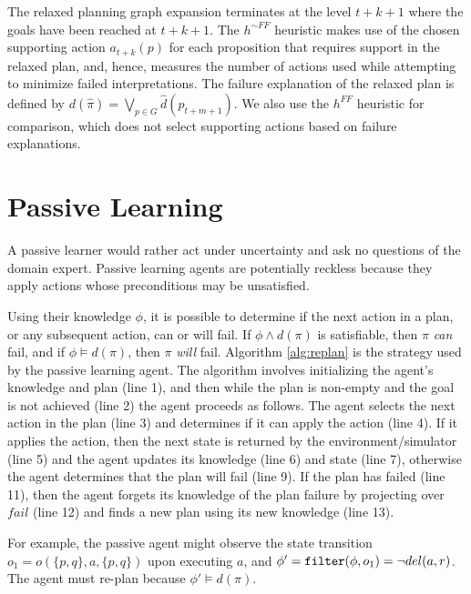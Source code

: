 \documentclass[letterpaper]{article}
\def\citep#1{\cite{#1}}
\begin{document}
 The relaxed planning graph expansion terminates
at the level $t+k+1$ where the goals have
been reached at $t+k+1$. The $h^{\sim FF}$ heuristic makes use of the chosen
supporting action $a_{t+k}(p)$ for each proposition that requires support in the relaxed
plan, and, hence, measures the number of actions used while attempting to
minimize failed interpretations.  The failure explanation of the relaxed plan is
defined by $d(\hat{\pi}) = \bigvee\limits_{p \in G} \hat{d}(p_{t+m+1})$.  We
also use the $h^{FF}$ heuristic \citep{hoffmann:nebel:jair-01} for comparison,
which does not select supporting actions based on failure explanations.


\section{Passive Learning}

A passive learner would rather act
under uncertainty and ask no questions of the domain expert.  Passive learning
agents are potentially reckless because 
they apply actions whose preconditions may be unsatisfied.  

Using their knowledge $\phi$, it is possible to determine if the next action in
a plan, or any subsequent action, can or will fail.  If  $\phi \wedge d(\pi)$ is
satisfiable, then $\pi$ {\em can} fail, and if $\phi \models d(\pi)$,
then $\pi$ {\em will}  fail.  
Algorithm \ref{alg:replan} is the strategy used by the passive learning agent. 
The algorithm involves initializing the agent's knowledge and plan (line 1), and then while
the plan is non-empty and the goal is not achieved (line 2) the agent proceeds
as follows.  The agent selects the next action in the plan (line 3) and
determines if it can apply the action (line 4).  If it applies the action, then
the next state is returned by the environment/simulator (line 5) and the agent
updates its knowledge (line 6) and state (line 7),
otherwise the agent determines that the plan will fail (line 9).  If the plan
has failed (line 11), then the agent forgets its knowledge of the plan failure
by projecting over $fail$ (line 12) and finds a new plan using its new knowledge
(line 13).

For example, the passive agent might observe the state transition $o_1
= o(\{p,q\}, a, \{p,q\})$ upon executing $a$, and $\phi' = {\tt filter}(\phi,
o_1) = \neg del(a, r)$.  The agent must re-plan because $\phi' \models d(\pi)$.
\end{document}
